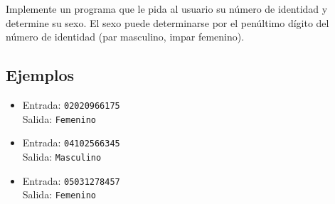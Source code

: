 Implemente un programa que le pida al usuario su número de identidad y determine su sexo. El sexo puede determinarse por el penúltimo dígito del número de identidad (par masculino, impar femenino).

\subsection*{Ejemplos}
\begin{itemize}
    \item Entrada: \texttt{02020966175}\\
          Salida: \texttt{Femenino}
    
    \item Entrada: \texttt{04102566345}\\
          Salida: \texttt{Masculino}
    
    \item Entrada: \texttt{05031278457}\\
          Salida: \texttt{Femenino}
\end{itemize}

